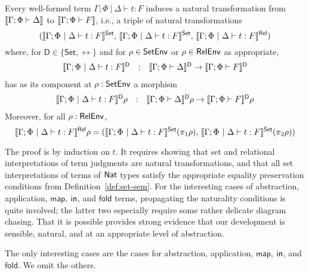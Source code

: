 \documentclass{lmcs}
\theoremstyle{plain}\newtheorem{satz}[thm]{Satz}
\newcommand{\fold}{\mathsf{fold}}
\newcommand{\set}{\mathsf{Set}}
\newcommand{\map}{\mathsf{map}}
\begin{document}
\begin{thm}\label{thm:at-gen}
Every well-formed term $\Gamma;\Phi~|~\Delta \vdash t : F$ induces
a natural transformation from $\llbracket{\Gamma; \Phi \vdash \Delta}\rrbracket$ to
$\llbracket{\Gamma; \Phi \vdash F}\rrbracket$, i.e., a triple of natural
transformations 
\[(\setsem{\Gamma;\Phi~|~\Delta \vdash t : F},\,
\setsem{\Gamma;\Phi~|~\Delta \vdash t : F},\,
\relsem{\Gamma;\Phi~|~\Delta \vdash t : F})\]
where, for $\mathsf{D} \in \{\set,\rel\}$ and for $\rho \in \mathsf{SetEnv}$
or $\rho \in \mathsf{RelEnv}$ as appropriate,
\[\begin{array}{lll}
\llbracket{\Gamma;\Phi~|~\Delta \vdash t : F}\rrbracket^{\mathsf D} & : & \llbracket{\Gamma;
  \Phi \vdash \Delta}\rrbracket^{\mathsf D} \to \llbracket{\Gamma; \Phi \vdash F}\rrbracket^{\mathsf D}
\end{array}\]
has as its component at $\rho : \mathsf{SetEnv}$ a morphism
\[\begin{array}{lll}
\llbracket{\Gamma;\Phi~|~\Delta \vdash t : F}\rrbracket^{\mathsf D}\rho & : & \llbracket{\Gamma;
  \Phi \vdash \Delta}\rrbracket^{\mathsf D}\rho \to \llbracket{\Gamma; \Phi \vdash F}\rrbracket^{\mathsf D}\rho
\end{array}\]
Moreover, for all $\rho : \mathsf{RelEnv}$, 
\begin{equation}\label{eq:projs}
\relsem{\Gamma;\Phi~|~\Delta \vdash t : F}\rho =
(\setsem{\Gamma;\Phi~|~\Delta \vdash t : F}(\pi_1 \rho),\,
\setsem{\Gamma;\Phi~|~\Delta \vdash t : F}(\pi_2 \rho))
\end{equation}
\end{thm}
\proof The proof is by induction on $t$. It requires showing that set
and relational interpretations of term judgments are natural
transformations, and that all set interpretations of terms of $\mathsf{Nat}$
types satisfy the appropriate equality preservation conditions from
Definition~\ref{def:set-sem}.  For the interesting cases of
abstraction, application, $\map$, $\mathsf{in}$, and $\mathsf{fold}$ terms,
propagating the naturality conditions is quite involved; the latter
two especially require some rather delicate diagram chasing. That it
is possible provides strong evidence that our development is sensible,
natural, and at an appropriate level of abstraction.

The only interesting cases are the cases for abstraction, application,
$\map$, $\mathsf{in}$, and $\fold$. We omit the others.
\end{document}
